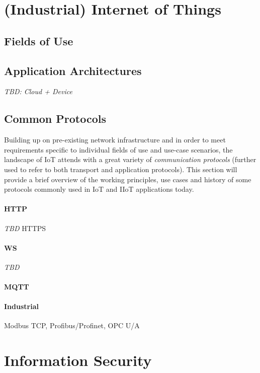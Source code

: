 \section{(Industrial) Internet of Things}
\label{sec:internet-of-things}
\subsection{Fields of Use}
\subsection{Application Architectures}
\emph{TBD: Cloud + Device}
\subsection{Common Protocols}
\label{sec:iot-common-protocols}
Building up on pre-existing network infrastructure and in order to meet requirements specific to individual fields of use and use-case scenarios, the landscape of \ac{IoT} attends with a great variety of \emph{communication protocols} (further used to refer to both transport and application protocols). This section will provide a brief overview of the working principles, use cases and history of some protocols commonly used in \ac{IoT} and \ac{IIoT} applications today.
\paragraph{\ac{HTTP}} \emph{TBD} %
\ac{HTTPS}
\paragraph{\ac{WS}} \emph{TBD}

\paragraph{\ac{MQTT}}
\cite{gupta_banks_2015}

\paragraph{Industrial} Modbus \ac{TCP}, Profibus/Profinet, \ac{OPC U/A}

\section{Information Security}
\label{sec:information-security}
